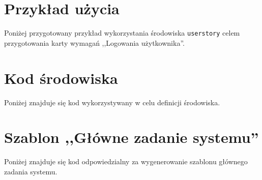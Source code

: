 \section{Przykład użycia}
\label{sec:dodatekApu}

Poniżej przygotowany przykład wykorzystania środowiska \texttt{userstory} celem przygotowania karty wymagań ,,Logowania użytkownika''.


\section{Kod środowiska}
\label{sec:dodatekAks}

Poniżej znajduje się kod wykorzystywany w celu definicji środowiska.


\section{Szablon ,,Główne zadanie systemu''}
\label{sec:dodatekAsgzs}

Poniżej znajduje się kod odpowiedzialny za wygenerowanie szablonu głównego zadania systemu.

